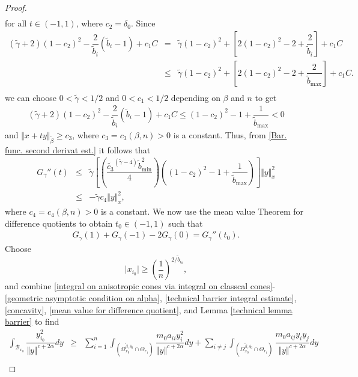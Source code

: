 \documentclass[10pt, leqno]{article}
\theoremstyle{definition}
\theoremstyle{remark}
\numberwithin{equation}{section}
\begin{document}
\begin{proof}
\begin{eqnarray}
\end{eqnarray}
for all $t\in \left(-1, 1 \right)$, where $c_{2} = \delta_{0}$. Since
\begin{eqnarray}
\label{c1 small and c2 almost 1}
\left( \tilde{\gamma} + 2 \right) (1 - c_{2})^{2} - \dfrac{2}{\tilde{b}_{i}}(\tilde{b}_{i} - 1) + c_{1} C & = & \nonumber  \tilde{\gamma}(1 - c_{2})^{2} + \left[2(1 - c_{2})^{2} - 2 + \dfrac{2}{\tilde{b}_{i}} \right] + c_{1} C \\ \nonumber
& \leq &  \tilde{\gamma}(1 - c_{2})^{2} + \left[2(1 - c_{2})^{2} - 2 + \dfrac{2}{\tilde{b}_{\max}}\right] + c_{1} C. \\ \nonumber
\end{eqnarray}
we can choose $0 < \tilde{\gamma} < 1/2 $ and $0 < c_{1} < 1/2$ depending on $\beta$ and $n$ to get
\begin{eqnarray}
\label{c1 small and c2 almost 1  2}
\left( \tilde{\gamma} + 2 \right) (1 - c_{2})^{2} - \dfrac{2}{\tilde{b}_{i}}(\tilde{b}_{i} - 1) + c_{1} C \leq (1 - c_{2})^{2} - 1 + \dfrac{1}{\tilde{b}_{\max}} < 0
\end{eqnarray}
and $\Vert  x + t y \Vert_{\tilde{\beta}} \geq c_{3}$, where $c_{3}=c_{3}(\beta,n)> 0$ is a constant. Thus, from \eqref{Bar. func. second derivat est.} it follows that
\begin{eqnarray}
\label{concavity}
G_{\gamma}''(t) & \leq & \nonumber \tilde{\gamma} \left[ \left( \dfrac{\tilde{c_{3}}^{(\tilde{\gamma}- 4)}\tilde{b}^{2}_{\min}}{4}\right)\left( (1 - c_{2})^{2} - 1 + \dfrac{1}{\tilde{b}_{\max}} \right) \right] \Vert y \Vert^{2}_{x} \\
& \leq & -\tilde{\gamma} c_{4} \Vert y \Vert^{2}_{x},
\end{eqnarray}
where $c_{4}= c_{4}(\beta,n)>0$ is a constant. We now use the mean value Theorem for difference quotients to obtain $t_{0} \in (-1, 1)$ such that
\begin{eqnarray}
\label{mean value for difference quotient}
G_{\gamma}(1) + G_{\gamma}(-1) - 2G_{\gamma}(0) = G_{\gamma}''(t_{0}).
\end{eqnarray}
Choose
$$
\vert x_{i_{0}} \vert \geq \left(\dfrac{1}{n} \right)^{2/\tilde{b}_{i_{0}}},
$$
and combine \eqref{integral on anisotropic cones via integral on classcal cones}-\eqref{geometric asymptotic condition on alpha}, \eqref{technical barrier integral estimate}, \eqref{concavity}, \eqref{mean value for difference quotient}, and Lemma \ref{technical lemma barrier} to find
\begin{eqnarray}
\int_{\mathcal{B}_{x_{0}}} \dfrac{y^{2}_{i_{0}}}{\Vert y \Vert^{c+2\alpha}} dy & \geq &  \nonumber  \sum_{i=1}^{n} \int_{\left(\Omega^{\tilde{\beta}, \delta_{0}}_{x_{0}}\cap \Theta_{r_{1}} \right)} \dfrac{m_{0}a_{ii} y^{2}_{i}}{\Vert y \Vert^{c+2\alpha}} dy + \sum_{i\neq j}^{} \int_{\left(\Omega^{\tilde{\beta}, \delta_{0}}_{x_{0}}\cap \Theta_{r_{1}}\right)} \dfrac{m_{0}a_{ij}y_{i}y_{j}}{\Vert y \Vert^{c+2\alpha}} dy \\ \nonumber

\end{eqnarray}
\end{proof}
\end{document}
